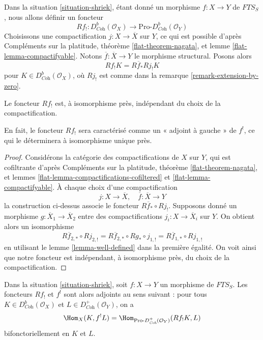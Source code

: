 \noindent
Dans la situation \ref{situation-shriek}, étant donné un morphisme $f : X \to Y$ de $\textit{FTS}_S$, nous allons définir un foncteur
$$
Rf_! : D^b_{\textit{Coh}}(\mathcal{O}_X)
\longrightarrow
\text{Pro-}D^b_{\textit{Coh}}(\mathcal{O}_Y)
$$
Choisissons une compactification $j : X \to \overline{X}$ sur $Y$, ce qui est possible d'après Compléments sur la platitude, théorème \ref{flat-theorem-nagata}, et lemme \ref{flat-lemma-compactifyable}. Notons $\overline{f} : \overline{X} \to Y$ le morphisme structural. Posons alors
$$
Rf_!K  = R\overline{f}_* Rj_! K
$$
pour $K \in D^b_{\textit{Coh}}(\mathcal{O}_X)$, où $Rj_!$ est comme dans la remarque \ref{remark-extension-by-zero}.

\begin{lemma}
\label{lemma-lower-shriek-well-defined}
Le foncteur $Rf_!$ est, à isomorphisme près, indépendant du choix de la compactification.
\end{lemma}

\noindent
En fait, le foncteur $Rf_!$ sera caractérisé comme un « adjoint à gauche » de $f^!$, ce qui le déterminera à isomorphisme unique près.

\begin{proof}
Considérons la catégorie des compactifications de $X$ sur $Y$, qui est cofiltrante d'après Compléments sur la platitude, théorème \ref{flat-theorem-nagata}, et lemmes \ref{flat-lemma-compactifications-cofiltered} et \ref{flat-lemma-compactifyable}. À chaque choix d'une compactification
$$
j : X \to \overline{X},\quad \overline{f} : \overline{X} \to Y
$$
la construction ci-dessus associe le foncteur $R\overline{f}_* \circ Rj_!$. Supposons donné un morphisme $g : \overline{X}_1 \to \overline{X}_2$ entre des compactifications $j_i : X \to \overline{X}_i$ sur $Y$. On obtient alors un isomorphisme
$$
R\overline{f}_{2, *} \circ Rj_{2, !} =
R\overline{f}_{2, *} \circ Rg_* \circ j_{1, !} =
R\overline{f}_{1, *} \circ Rj_{1, !}
$$
en utilisant le lemme \ref{lemma-well-defined} dans la première égalité. On voit ainsi que notre foncteur est indépendant, à isomorphisme près, du choix de la compactification.
\end{proof}

\begin{proposition}
\label{proposition-duality-compactly-supported}
Dans la situation \ref{situation-shriek}, soit $f : X \to Y$ un morphisme de $\textit{FTS}_S$. Les foncteurs $Rf_!$ et $f^!$ sont alors adjoints au sens suivant : pour tous $K \in D^b_{\textit{Coh}}(\mathcal{O}_X)$ et $L \in D^+_{\textit{Coh}}(\mathcal{O}_Y)$, on a
$$
\Hom_X(K, f^!L) =
\Hom_{\text{Pro-}D^+_{\textit{Coh}}(\mathcal{O}_Y)}(Rf_!K, L)
$$
bifonctoriellement en $K$ et $L$.
\end{proposition}

